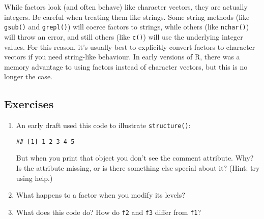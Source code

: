 While factors look (and often behave) like character vectors, they are
actually integers. Be careful when treating them like strings. Some
string methods (like \texttt{gsub()} and \texttt{grepl()}) will coerce
factors to strings, while others (like \texttt{nchar()}) will throw an
error, and still others (like \texttt{c()}) will use the underlying
integer values. For this reason, it's usually best to explicitly convert
factors to character vectors if you need string-like behaviour. In early
versions of R, there was a memory advantage to using factors instead of
character vectors, but this is no longer the case. 

\hypertarget{exercises-1}{%
\subsection{Exercises}\label{exercises-1}}

\begin{enumerate}
\def\labelenumi{\arabic{enumi}.}
\item
  An early draft used this code to illustrate \texttt{structure()}:

\begin{Shaded}
\begin{Highlighting}[]
\NormalTok{(}\OperatorTok{:}\NormalTok{, } \NormalTok{)}
\end{Highlighting}
\end{Shaded}

\begin{verbatim}
## [1] 1 2 3 4 5
\end{verbatim}

  But when you print that object you don't see the comment attribute.
  Why? Is the attribute missing, or is there something else special
  about it? (Hint: try using help.) 
\item
  What happens to a factor when you modify its levels?

\begin{Shaded}
\begin{Highlighting}[]
\StringTok{ }
\StringTok{ }\NormalTok{(}
\end{Highlighting}
\end{Shaded}
\item
  What does this code do? How do \texttt{f2} and \texttt{f3} differ from
  \texttt{f1}?

\begin{Shaded}
\begin{Highlighting}[]
\StringTok{ }\NormalTok{(}

\StringTok{ } 
\end{Highlighting}
\end{Shaded}
\end{enumerate}


